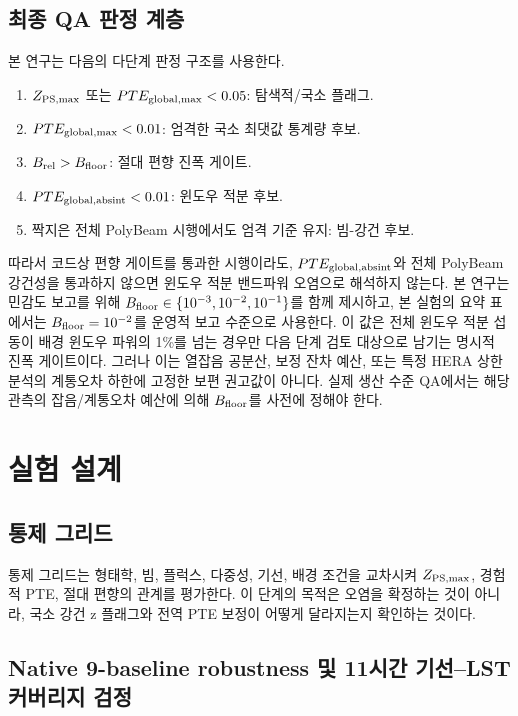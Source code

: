 \documentclass[final,5p,times]{elsarticle}
\begin{document}
\subsection{최종 QA 판정 계층}
\label{sec:metrics:hierarchy}

본 연구는 다음의 다단계 판정 구조를 사용한다.
\begin{enumerate}
  \item $Z_{\rm PS,max}$ 또는 $PTE_{\rm global,max}<0.05$: 탐색적/국소 플래그.
  \item $PTE_{\rm global,max}<0.01$: 엄격한 국소 최댓값 통계량 후보.
  \item $B_{\rm rel}>B_{\rm floor}$: 절대 편향 진폭 게이트.
  \item $PTE_{\rm global,absint}<0.01$: 윈도우 적분 후보.
  \item 짝지은 전체 PolyBeam 시행에서도 엄격 기준 유지: 빔-강건 후보.
\end{enumerate}
따라서 코드상 편향 게이트를 통과한 시행이라도, $PTE_{\rm global,absint}$와 전체 PolyBeam 강건성을
통과하지 않으면 윈도우 적분 밴드파워 오염으로 해석하지 않는다. 본 연구는 민감도 보고를 위해
$B_{\rm floor}\in\{10^{-3},10^{-2},10^{-1}\}$를 함께 제시하고, 본 실험의 요약 표에서는 $B_{\rm floor}=10^{-2}$를
운영적 보고 수준으로 사용한다. 이 값은 전체 윈도우 적분 섭동이 배경 윈도우 파워의 1\%를
넘는 경우만 다음 단계 검토 대상으로 남기는 명시적 진폭 게이트이다. 그러나 이는 열잡음 공분산,
보정 잔차 예산, 또는 특정 HERA 상한 분석의 계통오차 하한에 고정한 보편 권고값이 아니다.
실제 생산 수준 QA에서는 해당 관측의 잡음/계통오차 예산에 의해 $B_{\rm floor}$를 사전에 정해야 한다.

\section{실험 설계}
\label{sec:experiments}

\subsection{통제 그리드}
\label{sec:experiments:controlled}

통제 그리드는 형태학, 빔, 플럭스, 다중성, 기선, 배경 조건을 교차시켜
$Z_{\rm PS,max}$, 경험적 PTE, 절대 편향의 관계를 평가한다. 이 단계의 목적은 오염을
확정하는 것이 아니라, 국소 강건 z 플래그와 전역 PTE 보정이 어떻게 달라지는지 확인하는 것이다.

\subsection{Native 9-baseline robustness 및 11시간 기선--LST 커버리지 검정}
\label{sec:experiments:coverage}
\end{document}
